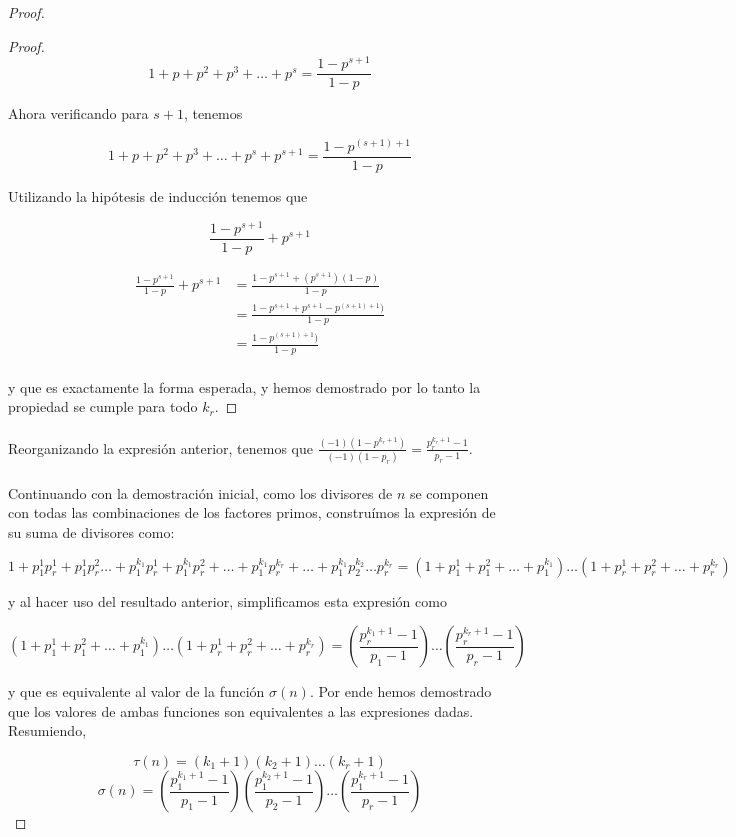 \documentclass{article}
\begin{document}
\begin{proof}
\begin{proof}
		$$1 + p + p^{2} + p^{3} + \dots + p^{s} = \frac{1 - p^{s + 1}}{1 - p} $$
		
		Ahora verificando para $s + 1$, tenemos
		
		$$1 + p + p^{2} + p^{3} + \dots + p^{s} + p^{s + 1} = \frac{1 - p^{(s + 1) + 1}}{1 - p}$$
		
		Utilizando la hipótesis de inducción tenemos que 
		
		$$\frac{1 - p^{s + 1}}{1 - p} + p^{s + 1}$$
		
		\begin{align*}
			\frac{1 - p^{s + 1}}{1 - p} + p^{s + 1} &= \frac{1 - p^{s + 1} + (p^{s + 1})(1 - p)}{1 - p}\\
			&= \frac{1 - p^{s + 1} + p^{s + 1} - p^{(s + 1) + 1})}{1 - p}\\
			&= \frac{1 - p^{(s + 1) + 1})}{1 - p}\\
		\end{align*}
		
		y que es exactamente la forma esperada, y hemos demostrado por lo tanto la propiedad se cumple para todo $k_r$.
	\end{proof}
	
	
	\paragraph{}Reorganizando la expresión anterior, tenemos que $\frac{(-1)(1 - p^{k_r + 1})}{(-1)(1 - p_r)} = \frac{p^{k_r + 1}_r - 1}{p_r - 1}$.
	
	\paragraph{} Continuando con la demostración inicial, como los divisores de $n$ se componen con todas las combinaciones de los factores primos, construímos la expresión de su suma de divisores como:
	
	$$1 + p^{1}_1 p^{1}_r + p^{1}_1 p^{2}_r \dots + p^{k_1}_1 p^{1}_r + p^{k_1}_1 p^{2}_r + \dots +  p^{k_1}_1 p^{k_r}_r + \dots +  p^{k_1}_{1} p^{k_2}_{2} \dots p^{k_r}_{r} = (1 + p^{1}_1 + p^{2}_1 + \dots +  p^{k_1}_1) \dots (1 + p^{1}_r + p^{2}_r + \dots +  p^{k_r}_r)$$
	
	y al hacer uso del resultado anterior, simplificamos esta expresión como
	
	
	$$(1 + p^{1}_1 + p^{2}_1 + \dots +  p^{k_1}_1) \dots (1 + p^{1}_r + p^{2}_r + \dots +  p^{k_r}_r) = \left( \frac{p^{k_1 + 1}_r - 1}{p_{1} - 1} \right) \dots \left( \frac{p^{k_r + 1}_r - 1}{p_r - 1} \right)$$
	
	y que es equivalente al valor de la función $\sigma(n)$. Por ende hemos demostrado que los valores de ambas funciones son equivalentes a las expresiones dadas. Resumiendo,
	
	$$\tau(n) = (k_1 + 1) (k_2 + 1) \dots (k_r + 1)$$
	$$\sigma(n) = \left( \frac{p^{k_1 + 1}_{1} - 1}{p_{1} - 1} \right) \left( \frac{p^{k_2 + 1}_{1} - 1}{p_{2} - 1} \right) \dots \left( \frac{p^{k_r + 1}_{1} - 1}{p_{r} - 1} \right)$$
	
\end{proof}
\end{document}
